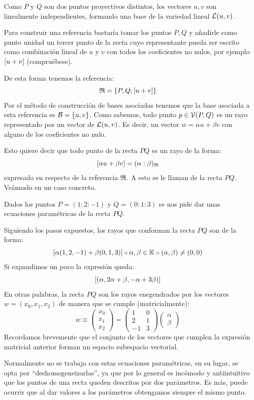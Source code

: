 Como $P$ y $Q$ son dos puntos proyectivos distintos, los vectores $u,v$ son linealmente independientes, formando una base de la variedad lineal $\mathcal{L}(u,v)$.
	
Para construir una referencia bastaría tomar los puntos $P,Q$ y añadirle como punto unidad un tercer punto de la recta cuyo representante pueda ser escrito como combinación lineal de $u$ y $v$ con todos los coeficientes no nulos, por ejemplo $\left [ u+v \right ]$ (compruébese).
	
De esta forma tenemos la referencia:
\[\mathfrak{R}=\{P,Q;\left [ u+v \right ]\}\]
Por el método de construcción de bases asociadas tenemos que la base asociada a esta referencia es $\mathcal{B}=\{u,v\}$. Como sabemos, todo punto $p\in\mathcal{V}(P,Q)$ es un rayo representado por un vector de $\mathcal{L}(u,v)$. Es decir, un vector $w=\alpha u+\beta v$ con alguno de los coeficientes no nulo.
	
Esto quiere decir que todo punto de la recta $PQ$ es un rayo de la forma: \[\left [ \alpha u+\beta v \right ]=(\alpha:\beta)_{\mathfrak{R}}\]
expresado en  respecto de la referencia $\mathfrak{R}$. A esto se le llaman  de la recta $PQ$. Veámoslo en un caso concreto.
\begin{exa}
	Dados los puntos $P=(1:2:-1)$ y $Q=(0:1:3)$ se nos pide dar unas ecuaciones paramétricas de la recta $PQ$.
	
	Siguiendo los pasos expuestos, los rayos que conforman la recta $PQ$ son de la forma:
	\[\left [ \alpha(1,2,-1)+\beta(0,1,3) \right ]\shortparallel \alpha,\beta\in\mathbb{K}\shortparallel(\alpha,\beta)\not=(0,0)\]
	Si expandimos un poco la expresión queda:
	\[\left [ (\alpha,2\alpha+\beta,-\alpha+3\beta) \right ]\]
	En otras palabras, la recta $PQ$ son los rayos enegendrados por los vectores $w=(x_0,x_1,x_2)$ de manera que se cumple (matricialmente):
	\[w\equiv\begin{pmatrix}
	x_0\\
	x_1\\
	x_2
	\end{pmatrix}=\begin{pmatrix}
	1 & 0\\
	2 & 1\\
	-1 & 3
	\end{pmatrix}\begin{pmatrix}
	\alpha\\
	\beta
	\end{pmatrix}\]
	Recordamos brevemente que el conjunto de los vectores que cumplen la expresión matricial anterior forman un espacio subespacio vectorial.
\end{exa}
Normalmente no se trabaja con estas ecuaciones paramétricas, en su lugar, se opta por ``deshomogeneizarlas'', ya que por lo general es incómodo y antiintuitivo que los puntos de una recta queden descritos por dos parámetros. Es más, puede ocurrir que al dar valores a los parámetros obtengamos siempre el mismo punto.

